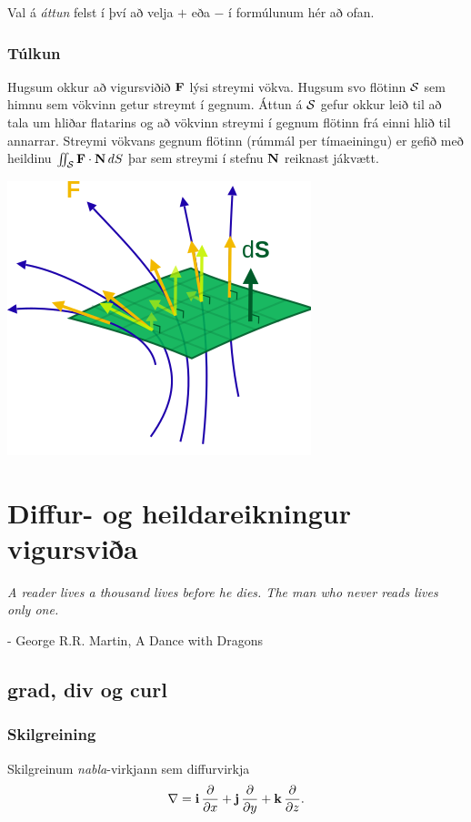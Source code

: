 \documentclass[a4paper,10pt,icelandic]{sphinxmanual}
\begin{document}
Val á \textit{áttun} felst í því að velja \(+\) eða \(-\) í formúlunum
hér að ofan.


\subsection{Túlkun}
\label{Kafli5:tulkun}
Hugsum okkur að vigursviðið \(\mbox{${\bf F}$}\) lýsi streymi vökva.
Hugsum svo flötinn \(\cal S\) sem himnu sem vökvinn getur streymt í
gegnum. Áttun á \(\cal S\) gefur okkur leið til að tala um hliðar
flatarins og að vökvinn streymi í gegnum flötinn frá einni hlið til
annarrar. Streymi vökvans gegnum flötinn (rúmmál per tímaeiningu) er
gefið með heildinu
\(\int\!\!\!\int_{\cal S} \mbox{${\bf F}$}\cdot\mbox{${\bf N}$}\,dS\)
þar sem streymi í stefnu \(\mbox{${\bf N}$}\) reiknast jákvætt.

{\hfill\includegraphics[width=0.400\linewidth]{flux.png}\hfill}


\chapter{Diffur- og heildareikningur vigursviða}
\label{Kafli6::doc}\label{Kafli6:diffur-og-heildareikningur-vigursvia}
\emph{A reader lives a thousand lives before he dies. The man who never reads lives only one.}

- George R.R. Martin, A Dance with Dragons


\section{grad, div og curl}
\label{Kafli6:grad-div-og-curl}

\subsection{Skilgreining}
\label{Kafli6:skilgreining}
Skilgreinum \emph{nabla}-virkjann sem diffurvirkja
\begin{gather}
\begin{split}\displaystyle \nabla=\mbox{${\bf i}$}\,\frac{\partial}{\partial x}+\mbox{${\bf j}$}\,\frac{\partial}{\partial y}+\mbox{${\bf k}$}\,\frac{\partial}{\partial z}.\end{split}\notag
\end{gather}
\end{document}
